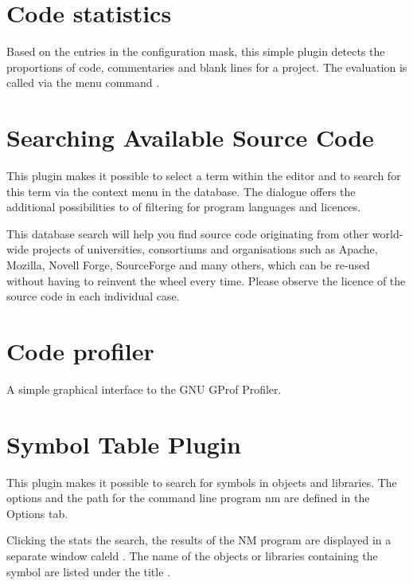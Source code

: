 \section{Code statistics}


Based on the entries in the configuration mask, this simple plugin detects the proportions of code, commentaries and blank lines for a project. The evaluation is called via the menu command .

\section{Searching Available Source Code}

This plugin makes it possible to select a term within the editor and to search for this term via the context menu  in the \cite{url:koders} database. The dialogue offers the additional possibilities to of filtering for program languages and licences.

This database search will help you find source code originating from other world-wide projects of universities, consortiums and organisations such as Apache, Mozilla, Novell Forge, SourceForge and many others, which can be re-used without having to reinvent the wheel every time. Please observe the licence of the source code in each individual case.

\section{Code profiler}

A simple graphical interface to the GNU GProf Profiler.

\section{Symbol Table Plugin}

This plugin makes it possible to search for symbols in objects and libraries. The options and the path for the command line program nm are defined in the Options tab.


Clicking the  stats the search, the results of the NM program are displayed in a separate window caleld . The name of the objects or libraries containing the symbol are listed under the title .

